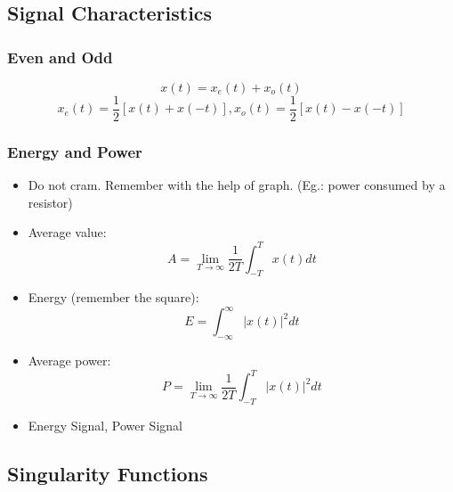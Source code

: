 \documentclass{beamer}
\begin{document}
\subsection{Signal Characteristics}
\begin{frame}
\frametitle{Even and Odd}
\begin{theorem}
\begin{displaymath}
x(t) = x_e(t) + x_o(t)
\end{displaymath}
\begin{displaymath}
x_e(t) = \frac{1}{2}[x(t)+x(-t)], x_o(t) = \frac{1}{2}[x(t)-x(-t)]
\end{displaymath}
\end{theorem}
\end{frame}

\begin{frame}
\frametitle{Energy and Power}
\begin{itemize}
\item Do not cram. Remember with the help of graph. (Eg.: power consumed by a resistor)    
\item Average value: \[A = \lim_{T \rightarrow \infty} \frac{1}{2T} \int_{-T}^{T} x(t)dt\]
\item Energy (remember the square): \[E = \int_{-\infty}^{\infty} |x(t)|^2 dt \]
\item Average power: \[P = \lim_{T \rightarrow \infty} \frac{1}{2T} \int_{-T}^{T} |x(t)|^2dt\]
\item Energy Signal, Power Signal 

\end{itemize}
\end{frame}
\subsection{Singularity Functions}
\end{document}
